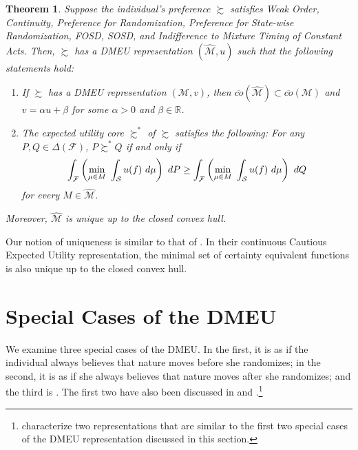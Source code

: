 \documentclass[12pt, notitlepage]{article}
\newtheorem{theorem}{Theorem}
\begin{document}
\begin{theorem}
\label{uniq}Suppose the individual's preference $\succsim $ satisfies Weak
Order, Continuity, Preference for Randomization, Preference for State-wise
Randomization, FOSD, SOSD, and Indifference to Mixture Timing of Constant
Acts. Then, $\succsim $ has a DMEU representation $\left( \widehat{\mathcal{M%
}},u\right) $ such that the following statements hold:

\begin{enumerate}
\item If $\succsim $ has a DMEU representation $(\mathcal{M},v)$, then $%
\overline{co}\left( \widehat{\mathcal{M}}\right) \subset \overline{co}(%
\mathcal{M})$ and $v=\alpha u+\beta $ for some $\alpha >0$ and $\beta \in 
\mathbb{R}$.

\item The expected utility core $\succsim ^{\ast }$ of $\succsim $ satisfies
the following: For any $P,Q\in \Delta (\mathcal{F})$, $P\succsim ^{\ast }Q$
if and only if%
\begin{equation*}
\int_{\mathcal{F}}\left( \underset{\mu \in M}{\min }~\int_{\mathcal{S}%
}u(f)~d\mu \right) ~dP\geq \int_{\mathcal{F}}\left( \underset{\mu \in M}{%
\min }~\int_{\mathcal{S}}u(f)~d\mu \right) ~dQ
\end{equation*}%
for every $M\in \widehat{\mathcal{M}}$.
\end{enumerate}

Moreover, $\widehat{\mathcal{M}}$ is unique up to the closed convex hull.
\end{theorem}

Our notion of uniqueness is similar to that of \cite%
{Cerreia-VioglioDillenbergerOrtoleva15}. In their continuous Cautious
Expected Utility representation, the minimal set of certainty equivalent
functions is also unique up to the closed convex hull.

\section{Special Cases of the DMEU}

\label{threeaxioms}We examine three special cases of the DMEU. In the first,
it is as if the individual always believes that nature moves before she
randomizes; in the second, it is as if she always believes that nature moves
after she randomizes; and the third is \cite{Saito15}. The first two have
also been discussed in \cite{Seo09} and \cite{Saito15}.\footnote{\cite%
{EpsteinMarinacciSeo07} characterize two representations that are similar to
the first two special cases of the DMEU representation discussed in this
section.}
\end{document}
